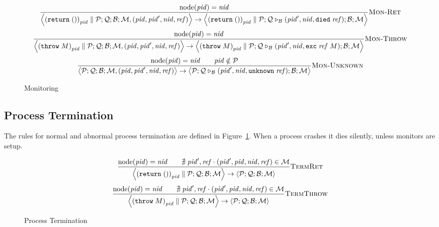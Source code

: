 \documentclass{article}
\newcommand{\sReturn}{\mathtt{return}}
\newcommand{\sThrow}[1]{\mathtt{throw} \; {#1}}
\DeclareMathOperator{\sNodeOf}{node}
\newcommand{\sExtend}[1]{\mathrel{\triangleright_{#1}}}
\newcommand{\sPar}{\mathrel{\parallel}}
\newcommand{\sNid}{\ensuremath{\mathit{nid}}}
\newcommand{\sPid}{\ensuremath{\mathit{pid}}}
\newcommand{\sRef}{\ensuremath{\mathit{ref}}}
\newcommand{\sSystem}[4]{\left\langle #1 ; #2 ; #3 ; #4 \right\rangle}
\newcommand{\sQueue}{\mathcal{Q}}
\newcommand{\sProcesses}{\mathcal{P}}
\newcommand{\sBlacklist}{\mathcal{B}}
\newcommand{\sMonitors}{\mathcal{M}}
\begin{document}
\begin{figure}
\begin{equation*}
\frac{
  \sNodeOf(\sPid) = \sNid
}{
  \sSystem{{(\sReturn \; ())}_\sPid \sPar \sProcesses}
          {\sQueue}
          {\sBlacklist}
          {\sMonitors, (\sPid, \sPid', \sNid, \sRef)}
\rightarrow
  \sSystem{{(\sReturn \; ())}_\sPid \sPar \sProcesses}
          {\sQueue \sExtend{\sBlacklist} (\sPid', \sNid, \mathtt{died} \; \sRef)}
          {\sBlacklist}
          {\sMonitors}
} \textsc{Mon-Ret}
\end{equation*}
%
\begin{equation*}
\frac{
  \sNodeOf(\sPid) = \sNid
}{
  \sSystem{{(\sThrow{M})}_\sPid \sPar \sProcesses}
          {\sQueue}
          {\sBlacklist}
          {\sMonitors, (\sPid, \sPid', \sNid, \sRef)}
\rightarrow
  \sSystem{{(\sThrow{M})}_\sPid \sPar \sProcesses}
          {\sQueue \sExtend{\sBlacklist} (\sPid', \sNid, \mathtt{exc} \; \sRef \; M)}
          {\sBlacklist}
          {\sMonitors}
} \textsc{Mon-Throw}
\end{equation*}
%
\begin{equation*}
\frac{
  \sNodeOf(\sPid) = \sNid
\qquad  
  \sPid \notin \sProcesses
}{
  \sSystem{\sProcesses}
          {\sQueue}
          {\sBlacklist}
          {\sMonitors, (\sPid, \sPid', \sNid, \sRef)}
\rightarrow
  \sSystem{\sProcesses}
          {\sQueue \sExtend{\sBlacklist} (\sPid', \sNid, \mathtt{unknown} \; \sRef)}
          {\sBlacklist}
          {\sMonitors}
} \textsc{Mon-Unknown}
\end{equation*}
%
\caption{Monitoring}
\end{figure}

\subsection{Process Termination}

The rules for normal and abnormal process termination are defined in
Figure~\ref{fig:termination}. When a process crashes it dies
silently, unless monitors are setup.  

\begin{figure}
\small
%
\begin{equation*}
\frac{
  \sNodeOf(\sPid) = \sNid
\qquad
  \nexists \; \sPid', \sRef \cdot (\sPid', \sPid, \sNid, \sRef) \in \sMonitors 
}{
  \sSystem{{(\sReturn \; ())}_\sPid \sPar \sProcesses}
          {\sQueue}
          {\sBlacklist}
          {\sMonitors}
\rightarrow          
  \sSystem{\sProcesses}
          {\sQueue}
          {\sBlacklist}
          {\sMonitors}
} \textsc{TermRet}
\end{equation*}
%
\begin{equation*}
\frac{
  \sNodeOf(\sPid) = \sNid
\qquad
  \nexists \; \sPid', \sRef \cdot (\sPid', \sPid, \sNid, \sRef) \in \sMonitors 
}{
  \sSystem{{(\sThrow{M})}_\sPid \sPar \sProcesses}
          {\sQueue}
          {\sBlacklist}
          {\sMonitors}
\rightarrow          
  \sSystem{\sProcesses}
          {\sQueue}
          {\sBlacklist}
          {\sMonitors}
} \textsc{TermThrow}
\end{equation*}
%
\caption{\label{fig:termination}Process Termination}
\end{figure}



\end{document}

